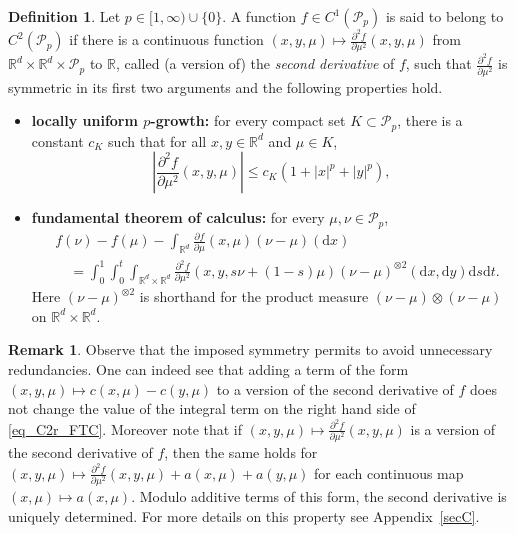 \documentclass{article}
\theoremstyle{definition}
\newtheorem{definition}[theorem]{Definition}
\newtheorem{remark}[theorem]{\textbf{Remark}}
\numberwithin{equation}{section}
\numberwithin{theorem}{section}
\newcommand{\R}{\mathbb{R}}
\newcommand{\dx}{\mathrm{d}x}
\newcommand{\dy}{\mathrm{d}y}
\newcommand{\ds}{\mathrm{d}s}
\newcommand{\dt}{\mathrm{d}t}
\newcommand{\Pcal}{{\mathcal P}}
\begin{document}
\begin{definition}\label{D_C2r}
Let $p \in [1,\infty) \cup \{0\}$. A function $f\in C^1(\Pcal_p)$ is said to belong to $C^2(\Pcal_p)$ if there is a continuous function $(x,y,\mu)\mapsto\frac{\partial^2 f}{\partial\mu^2}(x,y,\mu)$ from ${\R^d}\times {\R^d}\times\Pcal_p$ to $\R$, called (a version of) the \emph{second derivative} of $f$, such that $\frac{\partial^2 f}{\partial\mu^2}$ is symmetric in its first two arguments and  the following properties hold.
\begin{itemize}
\item \textbf{locally uniform $p$-growth:} for every compact set $K\subset\Pcal_p$, there is a constant $c_K$ such that for all $x,y\in {\R^d}$ and $\mu\in K$,
\begin{equation}\label{eq_C2r_p_growth}
\left| \frac{\partial^2 f}{\partial\mu^2}(x,y,\mu) \right| \le c_K (1+|x|^p+|y|^p),
\end{equation}
\item \textbf{fundamental theorem of calculus:} for every $\mu,\nu\in\Pcal_p$,
\begin{equation}\label{eq_C2r_FTC}
\begin{aligned}
&f(\nu) - f(\mu) - \int_{\R^d} \frac{\partial f}{\partial\mu}(x,\mu)(\nu-\mu)(\dx) \\
&\quad=\int_0^1 \int_0^t \int_{{\R^d}\times {\R^d}} \frac{\partial^2 f}{\partial\mu^2}(x,y,s\nu + (1-s)\mu)(\nu-\mu)^{\otimes 2}(\dx,\dy)\ds \dt.
\end{aligned}
\end{equation}
Here $(\nu-\mu)^{\otimes 2}$ is shorthand for the product measure $(\nu-\mu) \otimes (\nu-\mu)$ on $\R^d \times \R^d$.
\end{itemize}
\end{definition}


\begin{remark}
Observe that the imposed symmetry permits to avoid unnecessary redundancies. One can indeed see that adding a term of the form
$(x,y,\mu)\mapsto c(x,\mu)-c(y,\mu)$ to a version of the second derivative of $f$ does not change the value of
the integral term on the right hand side of \eqref{eq_C2r_FTC}.
Moreover note that  if  $(x,y,\mu)\mapsto\frac{\partial^2 f}{\partial\mu^2}(x,y,\mu)$ is a version of the second derivative of $f$, then the same holds for $(x,y,\mu)\mapsto\frac{\partial^2 f}{\partial\mu^2}(x,y,\mu)+a(x,\mu)+a(y,\mu)$ for each continuous map  $(x,\mu)\mapsto a(x,\mu)$.
 Modulo additive terms of this form, the second derivative is uniquely determined. For more details on this property see Appendix~\ref{secC}.
\end{remark}
\end{document}
